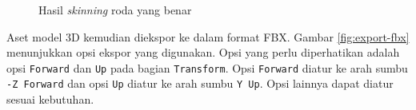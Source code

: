 \begin{figure}[!h]
    \centering
    \hfill
    \caption{Hasil \textit{skinning} roda yang benar}
    \label{fig:wheel-skinning}
\end{figure}

Aset model 3D kemudian diekspor ke dalam format FBX. Gambar \ref{fig:export-fbx}
menunjukkan opsi ekspor yang digunakan. Opsi yang perlu diperhatikan adalah opsi
\verb|Forward| dan \verb|Up| pada bagian \verb|Transform|. Opsi \verb|Forward|
diatur ke arah sumbu \verb|-Z Forward| dan opsi \verb|Up| diatur ke arah sumbu
\verb|Y Up|. Opsi lainnya dapat diatur sesuai kebutuhan.


